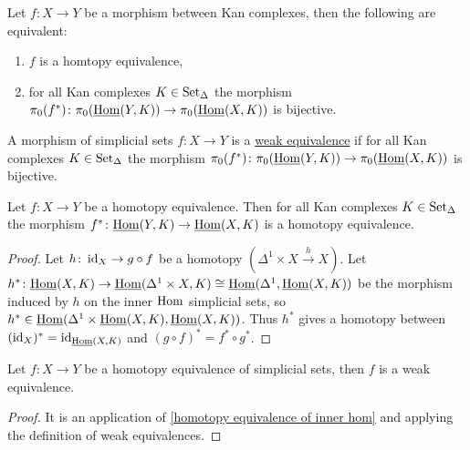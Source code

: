 \begin{prop}
\label{Homtopy eq. of Kan complexes are bij in pi_0(weak eq.)}
    Let $f\colon X \to Y$ be a morphism between Kan complexes, then the following are equivalent:
    \begin{enumerate}
        \item 
        $f$ is a homtopy equivalence,
        \item 
        for all Kan complexes $K \in \operatorname{Set}_{\Delta}$ the morphism $\pi_0(f^*) \colon \pi_0(\underline{\operatorname{Hom}}(Y,K)) \to \pi_0(\underline{\operatorname{Hom}}(X,K))$ is bijective.
    \end{enumerate}
\end{prop}

\begin{defi}
\label{weak equivalence}
    A morphism of simplicial sets $f\colon X \to Y$ is a \underline{weak equivalence} if for all Kan complexes $K \in \operatorname{Set}_{\Delta}$ the morphism $\pi_0(f^*) \colon \pi_0(\underline{\operatorname{Hom}}(Y,K)) \to \pi_0(\underline{\operatorname{Hom}}(X,K))$ is bijective.
\end{defi}

\begin{lem}
\label{homotopy equivalence of inner hom}
    Let $f\colon X \to Y$ be a homotopy equivalence. 
    Then for all Kan complexes $K \in \operatorname{Set}_{\Delta}$ the morphism $f^*\colon \underline{\operatorname{Hom}}(Y,K) \to \underline{\operatorname{Hom}}(X,K)$ is a homotopy equivalence.
\end{lem}

\begin{proof}
    Let $h\colon \operatorname{id}_X \to g \circ f$ be a homotopy $(\Delta^1 \times X \xrightarrow{h} X)$.
    Let $h^*\colon \underline{\operatorname{Hom}}(X,K) \to \underline{\operatorname{Hom}}(\Delta^1 \times X,K) \cong \underline{\operatorname{Hom}}(\Delta^1 , \underline{\operatorname{Hom}}(X,K))$ be the morphism induced by $h$ on the inner $\operatorname{Hom}$ simplicial sets, so $h^* \in \underline{\operatorname{Hom}}(\Delta^1 \times \underline{\operatorname{Hom}}(X,K), \underline{\operatorname{Hom}}(X,K))$.
    Thus $h^*$ gives a homotopy between $(\operatorname{id}_X)^*=\operatorname{id}_{\underline{\operatorname{Hom}}(X,K)}$ and $(g \circ f)^* = f^* \circ g^*$.
\end{proof}

\begin{cor}
    Let $f \colon X  \to  Y$ be a homotopy equivalence of simplicial sets, then $f$ is a weak equivalence.
\end{cor}

\begin{proof}
    It is an application of \cref{homotopy equivalence of inner hom} and applying the definition of weak equivalences.
\end{proof}


